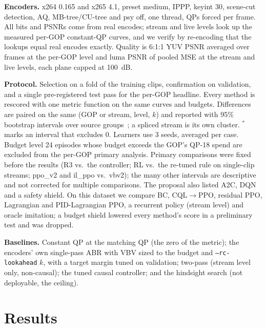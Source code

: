 \documentclass[conference]{IEEEtran}
\begin{document}
\textbf{Encoders.} x264 0.165 and x265 4.1, preset medium, IPPP, keyint 30, scene-cut detection, AQ, MB-tree/CU-tree and psy off, one thread, QPs forced per frame. All bits and PSNRs come from real encodes; stream and live levels look up the measured per-GOP constant-QP curves, and we verify by re-encoding that the lookups equal real encodes exactly. Quality is 6:1:1 YUV PSNR averaged over frames at the per-GOP level and luma PSNR of pooled MSE at the stream and live levels, each plane capped at 100~dB.

\textbf{Protocol.} Selection on a fold of the training clips, confirmation on validation, and a single pre-registered test pass for the per-GOP headline. Every method is rescored with one metric function on the same curves and budgets. Differences are paired on the same (GOP or stream, level, $k$) and reported with 95\% bootstrap intervals over source groups~\cite{efron1993bootstrap}; a spliced stream is its own cluster. ${}^{*}$ marks an interval that excludes 0. Learners use 3 seeds, averaged per case. Budget level 24 episodes whose budget exceeds the GOP's QP-18 spend are excluded from the per-GOP primary analysis. Primary comparisons were fixed before the results (R3 vs.\ the controller; RL vs.\ the re-tuned rule on single-clip streams; ppo\_v2 and il\_ppo vs.\ vbv2); the many other intervals are descriptive and not corrected for multiple comparisons. The proposal also listed A2C, DQN and a safety shield. On this dataset we compare BC, CQL$\to$PPO, residual PPO, Lagrangian and PID-Lagrangian PPO, a recurrent policy (stream level) and oracle imitation; a budget shield lowered every method's score in a preliminary test and was dropped.

\textbf{Baselines.} Constant QP at the matching QP (the zero of the metric); the encoders' own single-pass ABR with VBV sized to the budget and \texttt{--rc-lookahead} $k$, with a target margin tuned on validation; two-pass (stream level only, non-causal); the tuned causal controller; and the hindsight search (not deployable, the ceiling).

\section{Results}
\end{document}
